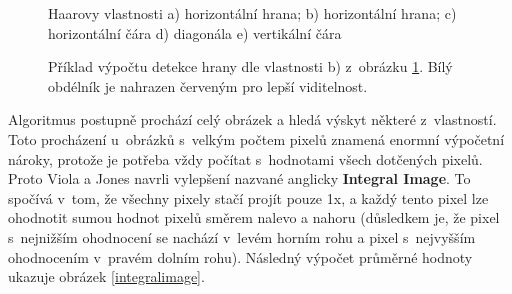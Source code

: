 \begin{figure}[H]
  \begin{center}
  \label{haarfeatures}
  \caption{Haarovy vlastnosti \cite{violaJonesArticle}
  a) horizontální hrana; b) horizontální hrana; c) horizontální čára d) diagonála e) vertikální čára}
  \end{center}
\end{figure}

\begin{figure}[H]
  \begin{center}
  \label{haarexample}
  \caption{Příklad výpočtu detekce hrany dle vlastnosti b) z~obrázku \ref{haarfeatures}. Bílý obdélník je nahrazen červeným pro lepší viditelnost.}
  \end{center}
\end{figure}

Algoritmus postupně prochází celý obrázek a hledá výskyt některé z~vlastností. Toto procházení u~obrázků s~velkým počtem pixelů znamená enormní výpočetní nároky, protože je potřeba vždy počítat s~hodnotami všech dotčených pixelů. Proto Viola a Jones \cite{violaJones} navrli
vylepšení nazvané anglicky \textbf{Integral Image}. To spočívá v~tom, že všechny pixely stačí projít pouze 1x, a každý tento pixel lze ohodnotit sumou hodnot pixelů směrem nalevo a nahoru (důsledkem je, že pixel s~nejnižším ohodnocení se nachází v~levém horním rohu a pixel s~nejvyšším ohodnocením v~pravém dolním rohu). Následný výpočet průměrné hodnoty ukazuje obrázek \ref{integralimage}. 


